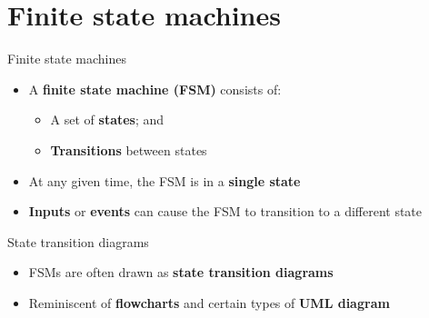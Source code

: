 \part{Finite state machines}
\frame{\partpage}

\begin{frame}{Finite state machines}
    \begin{itemize}
        \item A \textbf{finite state machine (FSM)} consists of: \pause
            \begin{itemize}
                \item A set of \textbf{states}; and \pause
                \item \textbf{Transitions} between states \pause
            \end{itemize}
        \item At any given time, the FSM is in a \textbf{single state} \pause
        \item \textbf{Inputs} or \textbf{events} can cause the FSM to transition to a different state
    \end{itemize}
\end{frame}

\begin{frame}{State transition diagrams}
    \begin{center}\end{center}
    \begin{itemize}
        \pause\item FSMs are often drawn as \textbf{state transition diagrams}
        \pause\item Reminiscent of \textbf{flowcharts} and certain types of \textbf{UML diagram} 
    \end{itemize}
\end{frame}

